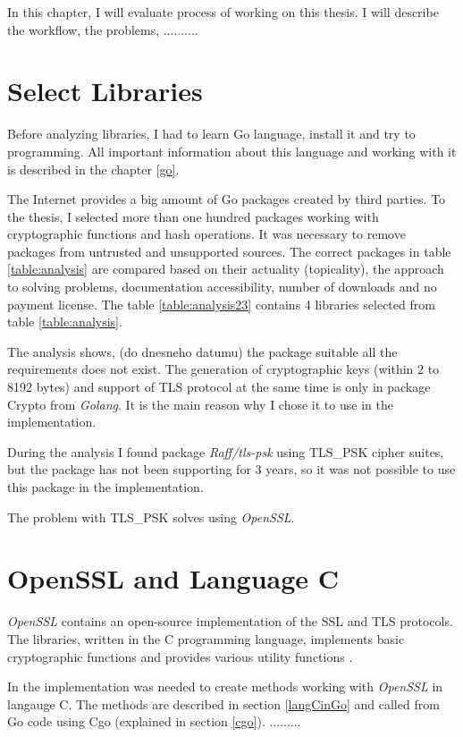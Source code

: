 \documentclass[
  digital, %
  notable,   %
  lof,     %
  lot,     %
]{fithesis3}
\begin{document}
In this chapter, I will evaluate process of working on this thesis. I will describe the workflow, the problems, ..........

\section{Select Libraries}
Before analyzing libraries, I had to learn Go language, install it and try to programming. All important information about this language and working with it is described in the chapter \ref{go}. 

The Internet provides a big amount of Go packages created by third parties. To the thesis, I selected more than one hundred packages working with cryptographic functions and hash operations. It was necessary to remove packages from untrusted and unsupported sources. The correct packages in table \ref{table:analysis} are compared based on their actuality (topicality), the approach to solving problems, documentation accessibility, number of downloads and no payment license. The table \ref{table:analysis23} contains 4 libraries selected from table \ref{table:analysis}. 

The analysis shows, (do dnesneho datumu) the package suitable all the requirements does not exist. The generation of cryptographic keys (within 2 to 8192 bytes) and support of TLS protocol at the same time is only in package Crypto from \textit{Golang}. It is the main reason why I chose it to use in the implementation. 

During the analysis I found package \textit{Raff/tls-psk} using TLS\_PSK cipher suites, but the package has not been supporting for 3 years, so it was not possible to use this package in the implementation. 

The problem with TLS\_PSK solves using \textit{OpenSSL}.

\section{OpenSSL and Language C}

\textit{OpenSSL} contains an open-source implementation of the SSL and TLS protocols. The libraries, written in the C programming language, implements basic cryptographic functions and provides various utility functions \cite{foundation}. 

In the implementation was needed to create methods working with \textit{OpenSSL} in langauge C. The methods are described in section \ref{langCinGo} and called from Go code using Cgo (explained in section \ref{cgo}). .........
\end{document}
